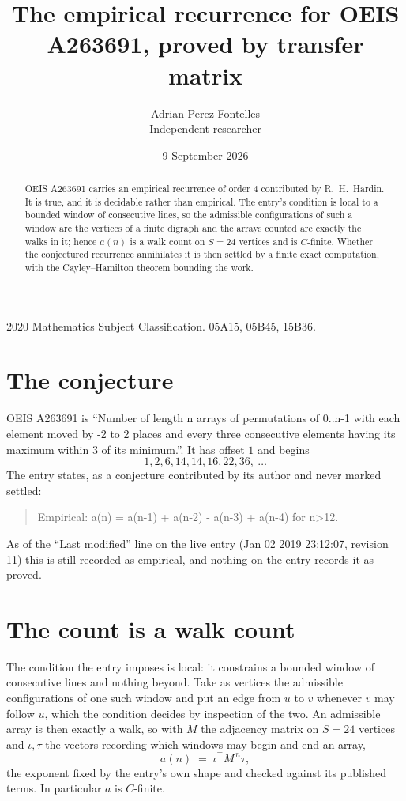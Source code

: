 \documentclass[11pt,a4paper]{article}
\title{The empirical recurrence for OEIS A263691, proved by transfer matrix}
\author{Adrian Perez Fontelles\\ \small Independent researcher}
\date{9 September 2026}
\theoremstyle{plain}
\theoremstyle{definition}
\begin{document}
\maketitle

\begin{abstract}
OEIS A263691 carries an empirical recurrence of order $4$ contributed by R.~H.~Hardin. It is
true, and it is decidable rather than empirical. The entry's condition is local to a bounded window of consecutive lines, so
the admissible configurations of such a window are the vertices of a finite digraph and the
arrays counted are exactly the walks in it; hence $a(n)$ is a walk count on $S=24$ vertices
and is $C$-finite. Whether the conjectured recurrence annihilates it is then settled by a
finite exact computation, with the Cayley--Hamilton theorem bounding the work.
\end{abstract}

\noindent\small 2020 Mathematics Subject Classification. 05A15, 05B45, 15B36.\normalsize

\section{The conjecture}

OEIS A263691 is ``Number of length n arrays of permutations of 0..n-1 with each element moved by -2 to 2 places and every three consecutive elements having its maximum within 3 of its minimum.''. It has offset $1$ and begins
\[
1, 2, 6, 14, 14, 16, 22, 36,\ \dots
\]
The entry states, as a conjecture contributed by its author and never marked settled:
\begin{quote}
Empirical: a(n) = a(n-1) + a(n-2) - a(n-3) + a(n-4) for n>12.
\end{quote}
As of the ``Last modified'' line on the live entry (Jan 02 2019 23:12:07, revision 11) this is still
recorded as empirical, and nothing on the entry records it as proved.

\section{The count is a walk count}

The condition the entry imposes is local: it constrains a bounded window of consecutive lines and nothing beyond. Take as
vertices the admissible configurations of one such window and put an edge from $u$ to $v$
whenever $v$ may follow $u$, which the condition decides by inspection of the two. An
admissible array is then exactly a walk, so with $M$ the adjacency matrix on $S=24$ vertices
and $\iota,\tau$ the vectors recording which windows may begin and end an array,
\[
a(n)\;=\;\iota^{\!\top}M^{\,n}\tau ,
\]
the exponent fixed by the entry's own shape and checked against its published terms. In
particular $a$ is $C$-finite.
\end{document}
